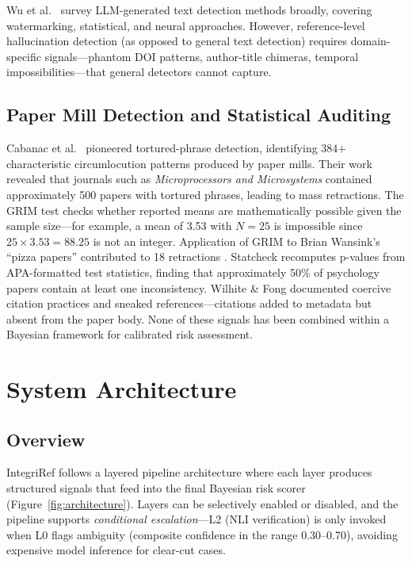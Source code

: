 \documentclass[sigconf,nonacm]{acmart}
\begin{document}
Wu et al.~\cite{wu2024llmdetect} survey LLM-generated text detection methods broadly, covering watermarking, statistical, and neural approaches.
However, reference-level hallucination detection (as opposed to general text detection) requires domain-specific signals---phantom DOI patterns, author-title chimeras, temporal impossibilities---that general detectors cannot capture.

\subsection{Paper Mill Detection and Statistical Auditing}

Cabanac et al.\ \cite{cabanac2021} pioneered tortured-phrase detection, identifying 384+ characteristic circumlocution patterns produced by paper mills.
Their work revealed that journals such as \emph{Microprocessors and Microsystems} contained approximately 500 papers with tortured phrases, leading to mass retractions.
The GRIM test \cite{brown2017grim} checks whether reported means are mathematically possible given the sample size---for example, a mean of 3.53 with $N=25$ is impossible since $25 \times 3.53 = 88.25$ is not an integer.
Application of GRIM to Brian Wansink's ``pizza papers'' contributed to 18 retractions \cite{vanderzee2017}.
Statcheck \cite{nuijten2016} recomputes p-values from APA-formatted test statistics, finding that approximately 50\% of psychology papers contain at least one inconsistency.
Wilhite \& Fong \cite{wilhite2012} documented coercive citation practices and sneaked references---citations added to metadata but absent from the paper body.
None of these signals has been combined within a Bayesian framework for calibrated risk assessment.

\section{System Architecture}
\label{sec:architecture}

\subsection{Overview}

IntegriRef follows a layered pipeline architecture where each layer produces structured signals that feed into the final Bayesian risk scorer (Figure~\ref{fig:architecture}).
Layers can be selectively enabled or disabled, and the pipeline supports \emph{conditional escalation}---L2 (NLI verification) is only invoked when L0 flags ambiguity (composite confidence in the range 0.30--0.70), avoiding expensive model inference for clear-cut cases.
\end{document}
